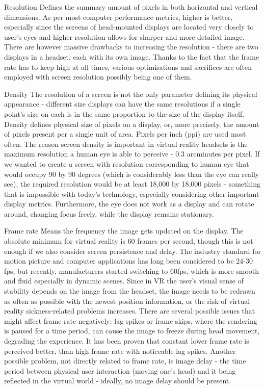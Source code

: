 \documentclass[12pt, a4paper]{article}
\newenvironment{definitions}
{\begin{description}[style=nextline]}
{\end{description}}
\begin{document}
\begin{definitions}
\item[Resolution] Defines the summary amount of pixels in both horizontal and vertical dimensions. As per most computer performance metrics, higher is better, especially since the screens of head-mounted displays are located very closely to user’s eyes and higher resolution allows for sharper and more detailed image. There are however massive drawbacks to increasing the resolution - there are two displays in a headset, each with its own image. Thanks to the fact that the frame rate has to keep high at all times, various optimisations and sacrifices are often employed with screen resolution possibly being one of them.
\item[Density] The resolution of a screen is not the only parameter defining its physical appearance - different size displays can have the same resolutions if a single point’s size on each is in the same proportion to the size of the display itself. Density defines physical size of pixels on a display, or, more precisely, the amount of pixels present per a single unit of area. Pixels per inch (ppi) are used most often. The reason screen density is important in virtual reality headsets is the maximum resolution a human eye is able to perceive - 0.3 arcminutes per pixel. If we wanted to create a screen with resolution corresponding to human eye that would occupy 90 by 90 degrees (which is considerably less than the eye can really see), the required resolution would be at least 18,000 by 18,000 pixels - something that is impossible with today’s technology, especially considering other important display metrics. Furthermore, the eye does not work as a display and can rotate around, changing focus freely, while the display remains stationary.
\item[Frame rate] Means the frequency the image gets updated on the display. The absolute minimum for virtual reality is 60 frames per second, though this is not enough if we also consider screen persistence and delay. The industry standard for motion picture and computer applications has long been considered to be 24-30 fps, but recently, manufacturers started switching to 60fps, which is more smooth and fluid especially in dynamic scenes. Since in VR the user’s visual sense of stability depends on the image from the headset, the image needs to be redrawn as often as possible with the newest position information, or the risk of virtual reality sickness-related problems increases. There are several possible issues that might affect frame rate negatively: lag spikes or frame skips, where the rendering is paused for a time period, can cause the image to freeze during head movement, degrading the experience. It has been proven that constant lower frame rate is perceived better, than high frame rate with noticeable lag spikes. Another possible problem, not directly related to frame rate, is image delay - the time period between physical user interaction (moving one’s head) and it being reflected in the virtual world - ideally, no image delay should be present.


\end{definitions}
\end{document}
